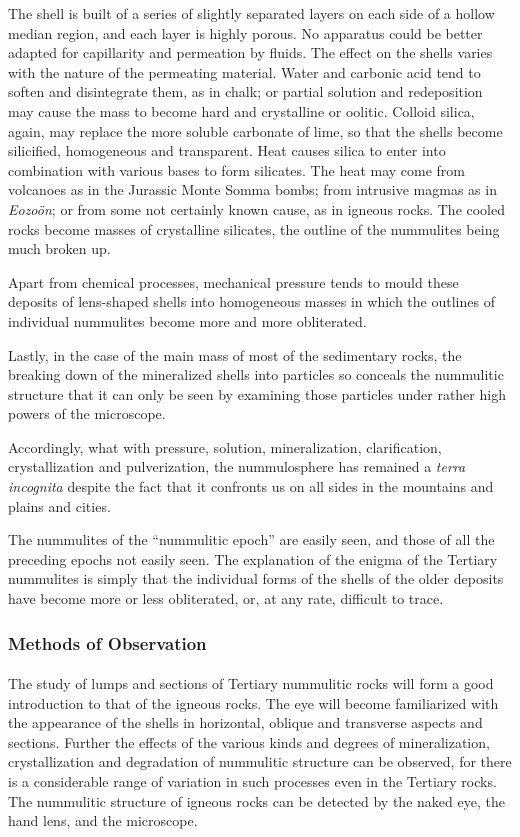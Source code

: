 \documentclass[a4paper, 12pt, oneside]{article}
\begin{document}
The shell is built of a series of slightly separated layers on each side of a hollow median region, and each layer is highly porous. No apparatus could be better adapted for capillarity and permeation by fluids. The effect on the shells varies with the nature of the permeating material. Water and carbonic acid tend to soften and disintegrate them, as in chalk; or partial solution and redeposition may cause the mass to become hard and crystalline or oolitic. Colloid silica, again, may replace the more soluble carbonate of lime, so that the shells become silicified, homogeneous and transparent. Heat causes silica to enter into combination with various bases to form silicates. The heat may come from volcanoes as in the Jurassic Monte Somma bombs; from intrusive magmas as in \emph{Eozoön}; or from some not certainly known cause, as in igneous rocks. The cooled rocks become masses of crystalline silicates, the outline of the nummulites being much broken up.

Apart from chemical processes, mechanical pressure tends to mould these deposits of lens-shaped shells into homogeneous masses in which the outlines of individual nummulites become more and more obliterated.

Lastly, in the case of the main mass of most of the sedimentary rocks, the breaking down of the mineralized shells into particles so conceals the nummulitic structure that it can only be seen by examining those particles under rather high powers of the microscope.

Accordingly, what with pressure, solution, mineralization, clarification, crystallization and pulverization, the nummulosphere has remained a \emph{terra incognita} despite the fact that it confronts us on all sides in the mountains and plains and cities.

The nummulites of the ``nummulitic epoch'' are easily seen, and those of all the preceding epochs not easily seen. The explanation of the enigma of the Tertiary nummulites is simply that the individual forms of the shells of the older deposits have become more or less obliterated, or, at any rate, difficult to trace.

\subsubsection{Methods of Observation}
\paragraph{}
The study of lumps and sections of Tertiary nummulitic rocks will form a good introduction to that of the igneous rocks. The eye will become familiarized with the appearance of the shells in horizontal, oblique and transverse aspects and sections. Further the effects of the various kinds and degrees of mineralization, crystallization and degradation of nummulitic structure can be observed, for there is a considerable range of variation in such processes even in the Tertiary rocks. The nummulitic structure of igneous rocks can be detected by the naked eye, the hand lens, and the microscope.
\end{document}
